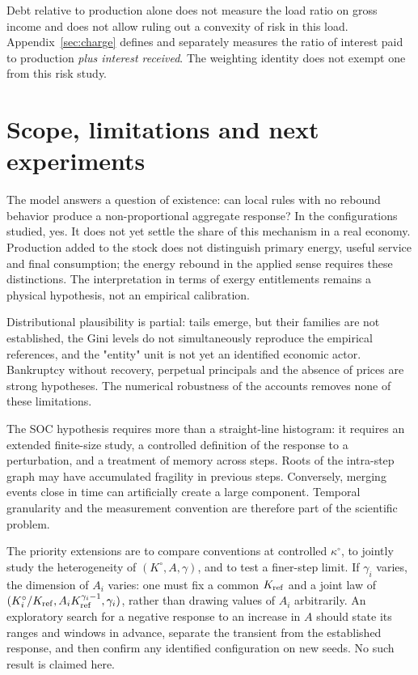 Debt relative to production alone does not measure the load ratio on
gross income and does not allow ruling out a convexity of risk in this
load. Appendix~\ref{sec:charge} defines and separately measures the
ratio of interest paid to production \emph{plus interest received}. The
weighting identity does not exempt one from this risk study.

\section{Scope, limitations and next experiments}\label{sec:perspectives}
The model answers a question of existence: can local rules with no
rebound behavior produce a non-proportional aggregate response? In the
configurations studied, yes. It does not yet settle the share of this
mechanism in a real economy. Production added to the stock does not
distinguish primary energy, useful service and final consumption; the
energy rebound in the applied sense \cite{sorrell} requires these
distinctions. The interpretation in terms of exergy entitlements
remains a physical hypothesis, not an empirical calibration.

Distributional plausibility is partial: tails emerge, but their
families are not established, the Gini levels do not simultaneously
reproduce the empirical references, and the "entity" unit is not yet an
identified economic actor. Bankruptcy without recovery, perpetual
principals and the absence of prices are strong hypotheses. The
numerical robustness of the accounts removes none of these limitations.

The SOC hypothesis requires more than a straight-line histogram: it
requires an extended finite-size study, a controlled definition of the
response to a perturbation, and a treatment of memory across steps.
Roots of the intra-step graph may have accumulated fragility in
previous steps. Conversely, merging events close in time can
artificially create a large component. Temporal granularity and the
measurement convention are therefore part of the scientific problem.

The priority extensions are to compare conventions at controlled
$\kappa^\circ$, to jointly study the heterogeneity of
$(K^\circ,A,\gamma)$, and to test a finer-step limit. If $\gamma_i$
varies, the dimension of $A_i$ varies: one must fix a common
$K_{\rm ref}$ and a joint law of
$(K_i^\circ/K_{\rm ref},A_iK_{\rm ref}^{\gamma_i-1},\gamma_i)$, rather
than drawing values of $A_i$ arbitrarily. An exploratory search for a
negative response to an increase in $A$ should state its ranges and
windows in advance, separate the transient from the established
response, and then confirm any identified configuration on new seeds.
No such result is claimed here.

